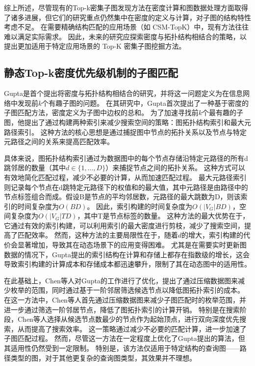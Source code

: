 综上所述，尽管现有的Top-k密集子图发现方法在密度计算和图数据处理方面取得了诸多进展，但它们的研究重点仍然集中在密度的定义与计算，对子图的结构特性考虑不足。
在需要精确结构匹配的应用场景（如 CSM-TopK）中，现有方法往往难以满足实际需求。
因此，未来的研究应探索密度与拓扑结构相结合的策略，以提出更加适用于特定应用场景的 Top-K 密集子图挖掘方法。
\subsection{静态Top-k密度优先级机制的子图匹配}
Gupta\cite{static-topk-Gupta-DBLP:conf/icde/GuptaGYCH14}是首个提出将密度与拓扑结构相结合的研究，并将这一问题定义为在信息网络中发现前$k$个有趣子图的问题。
在其研究中，Gupta首次提出了一种基于密度的子图匹配方法，密度定义为子图中边权的总和。
为了加速寻找前$k$个最有趣的子图，他提出了通过构建两种索引来减少搜索空间的策略：图拓扑结构索引和最大元路径索引。
这种方法的核心思想是通过捕捉图中节点的拓扑关系以及节点与特定元路径之间的关系来提高匹配效率。

具体来说，图拓扑结构索引通过为数据图中的每个节点存储沿特定元路径的所有d跳邻居的数量（其中$d \in \{1,\dots,D\}$）来捕捉节点之间的拓扑关系。
这种方式可以有效地简化匹配过程，减少不必要的计算，从而加速匹配过程。
最大元路径索引则记录每个节点在d跳特定元路径下的权值和的最大值，其中元路径是由路径中的节点标签组合而成。假设B是节点的平均邻居数，元路径的最大跳数为D，则该索引的时间复杂度为$O(BD)$。
因此，索引构建的时间复杂度为$O(|V_G|BD)$，空间复杂度为$O(|V_G|TD)$，其中T是节点标签的数量。
这种方法的最大优势在于，它通过有效的索引构建，可以利用索引的最大密度进行剪枝，减少了搜索空间，提高了匹配效率。
然而，这种方法的主要局限性在于，随着$d$的增大，索引构建的代价会显著增加，导致其在动态场景下的应用变得困难。
尤其是在需要实时更新图数据的情况下，Gupta提出的索引结构在计算和存储上都存在指数级的增长，这会导致索引构建的计算成本和存储成本都迅速攀升，限制了其在动态图中的适用性。


在此基础上，Chen\cite{static-topk-Chen-DBLP:journals/ijprai/ChenLCTL18}等人对Gupta的工作进行了优化，提出了通过压缩数据图来减少枚举的范围，同时通过基于一阶邻居筛选候选节点以降低图拓扑索引的成本。
在这一方法中，Chen等人首先通过压缩数据图来减少子图匹配时的枚举范围，并进一步通过筛选一阶邻居节点，降低了图拓扑索引的计算开销。
特别是在搜索阶段，Chen\cite{static-topk-Chen-DBLP:journals/ijprai/ChenLCTL18}等人选择从候选节点数最少的节点作为起始顶点，进行双向深度优先搜索，从而提高了搜索效率。
这一策略通过减少不必要的匹配计算，进一步加速了子图匹配过程。
然而，尽管这一方法在一定程度上优化了Gupta提出的算法，但其适用性仍然受到一定限制。
特别是，该方法仅适用于特定结构的查询图——路径类型的图，对于其他更复杂的查询图类型，其效果并不理想。

